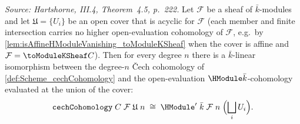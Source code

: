 \begin{lemma}
  \label{lem:cechCohomology_iso_HModule'}
  \textit{Source: Hartshorne, III.4, Theorem~4.5, p.~222.}
  Let \(\mathcal F\) be a sheaf of \(\bar k\)-modules and let
  \(\mathfrak U = \{U_i\}\) be an open cover that is acyclic for
  \(\mathcal F\) (each member and finite intersection carries no higher
  open-evaluation cohomology of \(\mathcal F\), e.g.\ by
  \cref{lem:isAffineHModuleVanishing_toModuleKSheaf} when the cover is
  affine and \(\mathcal F = \toModuleKSheaf C\)). Then for every degree
  \(n\) there is a \(\bar k\)-linear isomorphism between the degree-\(n\)
  Čech cohomology of \cref{def:Scheme_cechCohomology} and the
  open-evaluation \(\HModule \bar k\)-cohomology evaluated at the union of
  the cover:
  \[
    \mathtt{cechCohomology}\;C\;\mathcal F\;\mathfrak U\;n
      \;\cong\;
    \HModule'\;\bar k\;\mathcal F\;n\;\Bigl(\bigsqcup_i U_i\Bigr).
  \]
\end{lemma}

